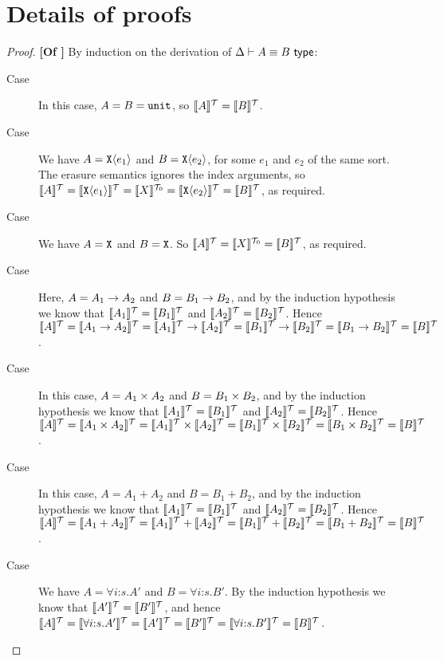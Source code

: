 \section{Details of proofs}

\begin{proof}\textbf{[Of ]}
  By induction on the derivation of $\Delta \vdash A \equiv B
  \isType$:
  \begin{description}
  \item[Case ] In this case, $A = B = \tyUnit$, so
    $\tySem{A} = \tySem{B}$.
  \item[Case ] We have $A = \tyPrim{X}{e_1}$ and
    $B = \tyPrim{X}{e_2}$, for some $e_1$ and $e_2$ of the same
    sort. The erasure semantics ignores the index arguments, so
    $\tySem{A} = \tySem{\tyPrim{X}{e_1}} = \tyPrimSem{X} =
    \tySem{\tyPrim{X}{e_2}} = \tySem{B}$, as required.
  \item[Case ] We have $A = \tyPrimNm{X}$ and
    $B = \tyPrimNm{X}$. So $\tySem{A} = \tyPrimSem{X} = \tySem{B}$, as
    required.
  \item[Case ] Here, $A = A_1 \tyArr A_2$ and $B =
    B_1 \tyArr B_2$, and by the induction hypothesis we know that
    $\tySem{A_1} = \tySem{B_1}$ and $\tySem{A_2} = \tySem{B_2}$. Hence
    $\tySem{A} = \tySem{A_1 \tyArr A_2} = \tySem{A_1} \to \tySem{A_2}
    = \tySem{B_1} \to \tySem{B_2} = \tySem{B_1 \tyArr B_2} =
    \tySem{B}$.
  \item[Case ] In this case, $A = A_1 \tyProduct
    A_2$ and $B = B_1 \tyProduct B_2$, and by the induction hypothesis
    we know that $\tySem{A_1} = \tySem{B_1}$ and $\tySem{A_2} =
    \tySem{B_2}$. Hence $\tySem{A} = \tySem{A_1 \tyProduct A_2} =
    \tySem{A_1} \times \tySem{A_2} = \tySem{B_1} \times \tySem{B_2} =
    \tySem{B_1 \tyProduct B_2} = \tySem{B}$.
  \item[Case ] In this case, $A = A_1 + A_2$ and $B =
    B_1 + B_2$, and by the induction hypothesis we know that
    $\tySem{A_1} = \tySem{B_1}$ and $\tySem{A_2} = \tySem{B_2}$. Hence
    $\tySem{A} = \tySem{A_1 + A_2} = \tySem{A_1} + \tySem{A_2} =
    \tySem{B_1} + \tySem{B_2} = \tySem{B_1 + B_2} = \tySem{B}$.
  \item[Case ] We have $A = \forall
    i\mathord:s.A'$ and $B = \forall i\mathord:s.B'$. By the induction
    hypothesis we know that $\tySem{A'} = \tySem{B'}$, and hence
    $\tySem{A} = \tySem{\forall i\mathord:s. A'} = \tySem{A'} =
    \tySem{B'} = \tySem{\forall i\mathord:s. B'} = \tySem{B}$.
  \end{description}
\end{proof}

